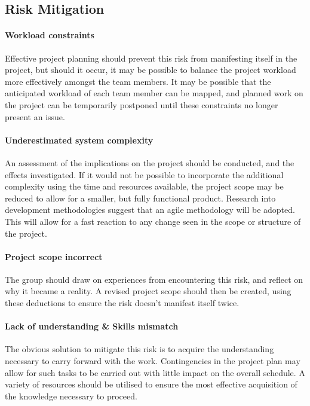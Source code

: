 \subsection{Risk Mitigation}
\paragraph{Workload constraints}
Effective project planning should prevent this risk from manifesting itself in the project, but should it occur, it may be possible to balance the project workload more effectively amongst the team members. It may be possible that the anticipated workload of each team member can be mapped, and planned work on the project can be temporarily postponed until these constraints no longer present an issue.

\paragraph{Underestimated system complexity}
An assessment of the implications on the project should be conducted, and the effects investigated. If it would not be possible to incorporate the additional complexity using the time and resources available, the project scope may be reduced to allow for a smaller, but fully functional product. Research into development methodologies suggest that an agile methodology will be adopted. This will allow for a fast reaction to any change seen in the scope or structure of the project.

\paragraph{Project scope incorrect}
The group should draw on experiences from encountering this risk, and reflect on why it became a reality. A revised project scope should then be created, using these deductions to ensure the risk doesn't manifest itself twice.

\paragraph{Lack of understanding \& Skills mismatch}
The obvious solution to mitigate this risk is to acquire the understanding necessary to carry forward with the work. Contingencies in the project plan may allow for such tasks to be carried out with little impact on the overall schedule. A variety of resources should be utilised to ensure the most effective acquisition of the knowledge necessary to proceed.

